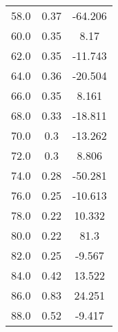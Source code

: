 \begin{table}[H]
\begin{tabular}{c c c}
        58.0  &  0.37  &  -64.206  \\
        60.0  &  0.35  &  8.17  \\
        62.0  &  0.35  &  -11.743  \\
        64.0  &  0.36  &  -20.504  \\
        66.0  &  0.35  &  8.161  \\
        68.0  &  0.33  &  -18.811  \\
        70.0  &  0.3  &  -13.262  \\
        72.0  &  0.3  &  8.806  \\
        74.0  &  0.28  &  -50.281  \\
        76.0  &  0.25  &  -10.613  \\
        78.0  &  0.22  &  10.332  \\
        80.0  &  0.22  &  81.3  \\
        82.0  &  0.25  &  -9.567  \\
        84.0  &  0.42  &  13.522  \\
        86.0  &  0.83  &  24.251  \\
        88.0  &  0.52  &  -9.417  \\
        \bottomrule
    \end{tabular}
\end{table}


